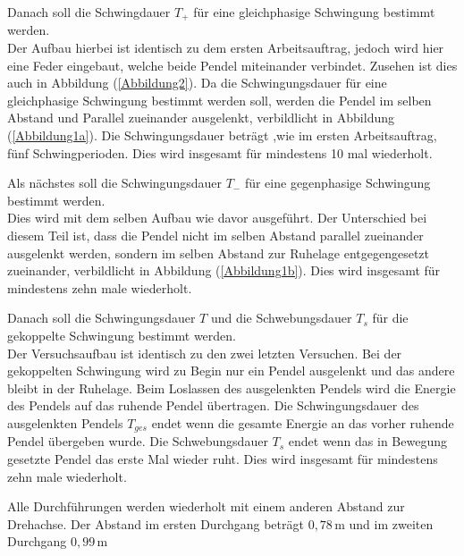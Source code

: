 \begin{flushleft}
    Danach soll die Schwingdauer $ T_{+} $  für eine gleichphasige Schwingung bestimmt werden. \\
    Der Aufbau hierbei ist identisch zu dem ersten Arbeitsauftrag, jedoch wird hier eine Feder eingebaut, welche beide Pendel miteinander verbindet.
    Zusehen ist dies auch in Abbildung (\ref{Abbildung2}).
    Da die Schwingungsdauer für eine gleichphasige Schwingung bestimmt werden soll, 
    werden die Pendel im selben Abstand und Parallel zueinander ausgelenkt, verbildlicht in Abbildung (\ref{Abbildung1a}). 
    Die Schwingungsdauer beträgt ,wie im ersten Arbeitsauftrag, fünf Schwingperioden.
    Dies wird insgesamt für mindestens 10 mal wiederholt.
\end{flushleft}

\begin{flushleft}
    Als nächstes soll die Schwingungsdauer $ T_{-} $ für eine gegenphasige Schwingung bestimmt werden. \\
    Dies wird mit dem selben Aufbau wie davor ausgeführt.
    Der Unterschied bei diesem Teil ist, dass die Pendel nicht im selben Abstand parallel zueinander ausgelenkt werden,
    sondern im selben Abstand zur Ruhelage entgegengesetzt zueinander, verbildlicht in Abbildung (\ref{Abbildung1b}).
    Dies wird insgesamt für mindestens zehn male wiederholt.
\end{flushleft}

\begin{flushleft}
    Danach soll die Schwingungsdauer $ T $ und die Schwebungsdauer $ T_{s} $ für die gekoppelte Schwingung bestimmt werden. \\
    Der Versuchsaufbau ist identisch zu den zwei letzten Versuchen. 
    Bei der gekoppelten Schwingung wird zu Begin nur ein Pendel ausgelenkt und das andere bleibt in der Ruhelage.
    Beim Loslassen des ausgelenkten Pendels wird die Energie des Pendels auf das ruhende Pendel übertragen.
    Die Schwingungsdauer des ausgelenkten Pendels $ T_{ges} $ endet wenn die gesamte Energie an das vorher ruhende Pendel übergeben wurde.
    Die Schwebungsdauer $ T_{s} $ endet wenn das in Bewegung gesetzte Pendel das erste Mal wieder ruht.
    Dies wird insgesamt für mindestens zehn male wiederholt.
\end{flushleft}

\begin{flushleft}
    Alle Durchführungen werden wiederholt mit einem anderen Abstand zur Drehachse.
    Der Abstand im ersten Durchgang beträgt $ 0,78\,\unit{\meter} $ und im zweiten Durchgang $ 0,99\,\unit{\meter} $
\end{flushleft}
